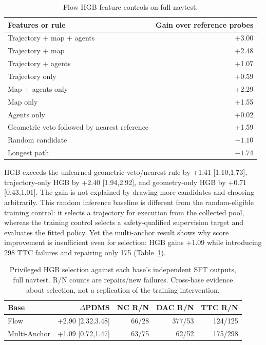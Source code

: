 \documentclass[10pt,letterpaper]{article}
\begin{document}
\begin{table}[H]
\centering\caption{Flow HGB feature controls on full navtest.}
\begin{tabular}{lr}\toprule
Features or rule & Gain over reference probes\\\midrule
Trajectory + map + agents & +3.00\\
Trajectory + map & +2.48\\
Trajectory + agents & +1.07\\
Trajectory only & +0.59\\
Map + agents only & +2.29\\
Map only & +1.55\\
Agents only & +0.02\\
Geometric veto followed by nearest reference & +1.59\\
Random candidate & $-1.10$\\
Longest path & $-1.74$\\\bottomrule
\end{tabular}
\end{table}
HGB exceeds the unlearned geometric-veto/nearest rule by +1.41 [1.10,1.73], trajectory-only HGB by +2.40 [1.94,2.92], and geometry-only HGB by +0.71 [0.43,1.01]. The gain is not explained by drawing more candidates and choosing arbitrarily. This random inference baseline is different from the random-eligible training control: it selects a trajectory for execution from the collected pool, whereas the training control selects a safety-qualified supervision target and evaluates the fitted policy. Yet the multi-anchor result shows why score improvement is insufficient even for selection: HGB gains +1.09 while introducing 298 TTC failures and repairing only 175 (Table~\ref{tab:crossbase}).

\begin{table}[H]
\centering\caption{Privileged HGB selection against each base's independent SFT outputs, full navtest. R/N counts are repairs/new failures. Cross-base evidence about selection, not a replication of the training intervention.}
\label{tab:crossbase}
\begin{tabular}{lrrrr}\toprule
Base & $\Delta$PDMS & NC R/N & DAC R/N & TTC R/N\\\midrule
Flow & +2.90 [2.32,3.48] & 66/28 & 377/53 & 124/125\\
Multi-Anchor & +1.09 [0.72,1.47] & 63/75 & 62/52 & 175/298\\\bottomrule
\end{tabular}
\end{table}
\end{document}

